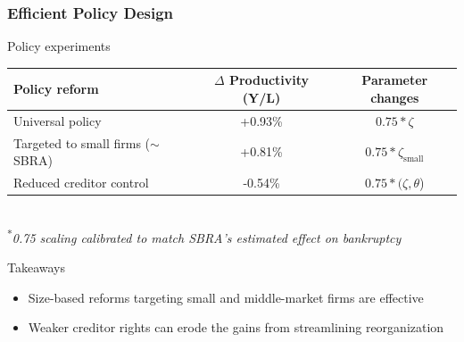 \documentclass[aspectratio=169,xcolor=table]{beamer}
\begin{document}
\begin{frame}[label=Framework] \frametitle{Efficient Policy Design}

Policy experiments 

\footnotesize
\begin{table}[H]
    \centering
    \renewcommand{\arraystretch}{0.9}
    \begin{tabular}{lc|c}
    \toprule
    \textbf{Policy reform} & \textbf{$\Delta$ Productivity (Y/L)} & \textbf{Parameter changes} \\
    \midrule
    Universal policy & +0.93\% & $0.75*\zeta$ \\
    Targeted to small firms ($\sim$ SBRA) & +0.81\% & $0.75*\zeta_{\text{small}}$ \\
    Reduced creditor control & -0.54\% & $ 0.75*(\zeta,\theta$) \\
    \bottomrule
    \end{tabular}
    \label{tab:percentage_changes2} \vspace{1mm} \\
    \hspace{26mm} \scriptsize \textsuperscript{*}\textit{0.75 scaling calibrated to match SBRA's estimated effect on bankruptcy}
\end{table} \vspace{-4mm}
\normalsize

Takeaways
\begin{itemize}
    \item Size-based reforms targeting small and middle-market firms are effective
    \item Weaker creditor rights can erode the gains from streamlining reorganization
\end{itemize}

\end{frame}
\end{document}
